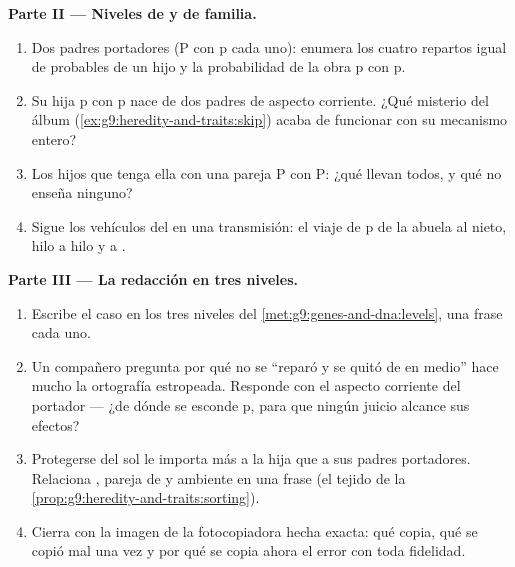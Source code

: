 \begin{problem}
\medskip\noindent\textbf{Parte II --- Niveles de 
y de familia.}
\begin{enumerate}[resume]
  \item Dos padres portadores (P con p cada uno): enumera los cuatro
        repartos igual de probables de un hijo y la probabilidad de la
        obra p con p.
  \item Su hija p con p nace de dos padres de aspecto corriente. ¿Qué
        misterio del álbum (\cref{ex:g9:heredity-and-traits:skip})
        acaba de funcionar con su mecanismo entero?
  \item Los hijos que tenga ella con una pareja P con P: ¿qué llevan
        todos, y qué no enseña ninguno?
  \item Sigue los vehículos del  en una transmisión: el viaje de p
        de la abuela al nieto, hilo a hilo y  a .
\end{enumerate}

\medskip\noindent\textbf{Parte III --- La redacción en tres
niveles.}
\begin{enumerate}[resume]
  \item Escribe el caso en los tres niveles del
        \cref{met:g9:genes-and-dna:levels}, una frase cada uno.
  \item Un compañero pregunta por qué no se ``reparó y se quitó de en
        medio'' hace mucho la ortografía estropeada. Responde con el
        aspecto corriente del portador --- ¿de dónde se esconde p, para
        que ningún juicio alcance sus efectos?
  \item Protegerse del sol le importa más a la hija que a sus padres
        portadores. Relaciona , pareja de  y ambiente en una
        frase (el tejido de la
        \cref{prop:g9:heredity-and-traits:sorting}).
  \item Cierra con la imagen de la fotocopiadora hecha exacta: qué
        copia, qué se copió mal una vez y por qué se copia ahora el
        error con toda fidelidad.
\end{enumerate}
\end{problem}
